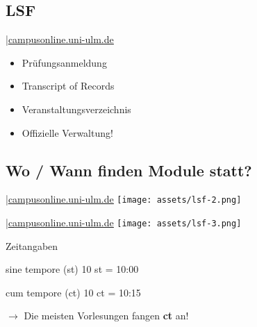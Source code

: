 \documentclass[
	aspectratio=169, 
	10pt 
]{beamer}
\newcommand*\annotatedFigureBoxCustom[8]{\draw[#5,thick,rounded corners] (#1) rectangle (#2);\node at (#4) [fill=#6,thick,shape=circle,draw=#7,inner sep=2pt,font=\sffamily,text=#8] {\textbf{#3}};}
\newcommand*\annotatedFigureBox[4]{\annotatedFigureBoxCustom{#1}{#2}{#3}{#4}{black}{white}{black}{black}}
\newenvironment {annotatedFigure}[1]{\centering\begin{tikzpicture}
    \node[anchor=south west,inner sep=0] (image) at (0,0) { #1};\begin{scope}[x={(image.south east)},y={(image.north west)}]}{\end{scope}\end{tikzpicture}}
\begin{document}
\subsection{LSF}
\begin{frame}{\insertsubsection \space|\space\underline{\href{https://campusonline.uni-ulm.de}{campusonline.uni-ulm.de}}}
    \begin{itemize}
        \item Prüfungsanmeldung
        \item Transcript of Records
        \item Veranstaltungsverzeichnis
        \item Offizielle Verwaltung!
    \end{itemize}
\end{frame}

\subsection{Wo / Wann finden Module statt?}


\begin{frame}{\insertsubsection \space|\space\underline{\href{https://campusonline.uni-ulm.de}{campusonline.uni-ulm.de}}}
    \texttt{[image: assets/lsf-2.png]}
\end{frame}

\begin{frame}{\insertsubsection \space|\space\underline{\href{https://campusonline.uni-ulm.de}{campusonline.uni-ulm.de}}}
    \texttt{[image: assets/lsf-3.png]}
\end{frame}

\begin{frame}{Zeitangaben}
    \begin{fancycolumns}
        \begin{definition}{sine tempore (st)}
            10 st = 10:00
        \end{definition}
        \nextcolumn
        \begin{definition}{cum tempore (ct)}
            10 ct = 10:15
        \end{definition}
    \end{fancycolumns}

    $\longrightarrow$ Die meisten Vorlesungen fangen \textbf{ct} an!
\end{frame}
\end{document}
